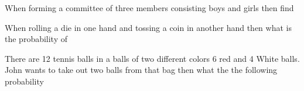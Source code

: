 \documentclass[11pt]{exam}
\begin{document}
\begin{questions}

\vspace{9cm}
\addpoints
\question[10]  When forming a committee of three members consisting boys and girls then find 
\vspace{10cm}

\question[10]  When rolling a die in one hand and tossing a coin in another hand then what is the probability of
\vspace{10cm}

\question[10] There are 12 tennis balls in a balls of two different colors 6 red and 4 White balls. John wants to take out two balls from that bag then what the the following probability 
\end{questions}
\end{document}
